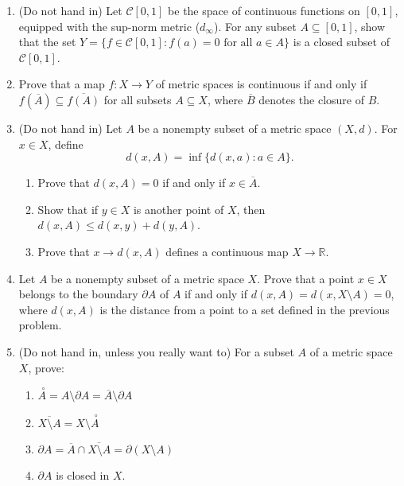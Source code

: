\documentclass[letterpaper,12pt]{article}
\newcommand{\R}{\mathbb{R}}
\newcommand{\inter}[1]{\overset{\,\,\circ}{#1}}
\begin{document}
\begin{enumerate}
\item (Do not hand in) Let $\mathcal{C}[0,1]$ be the space of continuous functions on $[0,1]$, equipped with the sup-norm metric ($d_\infty$). For any subset $A\subseteq [0,1]$, show that the set $Y=\{f\in \mathcal{C}[0,1] : f(a)=0 \text{ for all } a\in A\}$ is a closed subset of $\mathcal{C}[0,1]$.

\item Prove that a map $f:X\to Y$ of metric spaces is continuous if and only if $f(\overline{A})\subseteq \overline{f(A)}$ for all subsets $A\subseteq X$, where $\overline{B}$ denotes the closure of $B$.

\item (Do not hand in) Let $A$ be a nonempty subset of a metric space $(X,d)$. For $x\in X$, define
\[
d(x,A) = \inf\{d(x,a):a\in A\}.
\]
\begin{enumerate}
\item Prove that $d(x,A)=0$ if and only if $x\in \overline{A}$.
\item Show that if $y\in X$ is another point of $X$, then $d(x,A)\leq d(x,y)+d(y,A)$.
\item Prove that $x\to d(x,A)$ defines a continuous map $X\to \R$.
\end{enumerate}
\item Let $A$ be a nonempty subset of a metric space $X$. Prove that a point $x\in X$ belongs to the boundary $\partial A$ of $A$ if and only if $d(x,A) = d(x,X\setminus A)=0$, where $d(x,A)$ is the distance from a point to a set defined in the previous problem.
\item (Do not hand in, unless you really want to) For a subset $A$ of a metric space $X$, prove:
\begin{enumerate}
\item $\inter{A} = A\setminus \partial A = \overline{A}\setminus \partial A$
\item $\overline{X\setminus A} = X\setminus \inter{A}$
\item $\partial A = \overline{A}\cap \overline{X\setminus A} = \partial (X\setminus A)$
\item $\partial A$ is closed in $X$.
\end{enumerate}

\end{enumerate}
\end{document}

